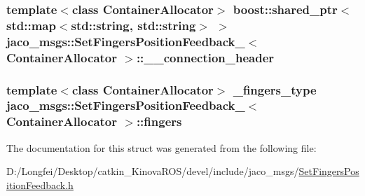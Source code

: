 \subsubsection[{\texorpdfstring{\+\_\+\+\_\+connection\+\_\+header}{__connection_header}}]{\setlength{\rightskip}{0pt plus 5cm}template$<$class Container\+Allocator$>$ boost\+::shared\+\_\+ptr$<$std\+::map$<$std\+::string, std\+::string$>$ $>$ {\bf jaco\+\_\+msgs\+::\+Set\+Fingers\+Position\+Feedback\+\_\+}$<$ Container\+Allocator $>$\+::\+\_\+\+\_\+connection\+\_\+header}\hypertarget{structjaco__msgs_1_1SetFingersPositionFeedback___ad1d89c219a6e6858c48e30c83ae4a0db}{}\label{structjaco__msgs_1_1SetFingersPositionFeedback___ad1d89c219a6e6858c48e30c83ae4a0db}
\subsubsection[{\texorpdfstring{fingers}{fingers}}]{\setlength{\rightskip}{0pt plus 5cm}template$<$class Container\+Allocator$>$ {\bf \+\_\+fingers\+\_\+type} {\bf jaco\+\_\+msgs\+::\+Set\+Fingers\+Position\+Feedback\+\_\+}$<$ Container\+Allocator $>$\+::fingers}\hypertarget{structjaco__msgs_1_1SetFingersPositionFeedback___ae2565d164d4f0daf1be357023e5d0be2}{}\label{structjaco__msgs_1_1SetFingersPositionFeedback___ae2565d164d4f0daf1be357023e5d0be2}


The documentation for this struct was generated from the following file\+:\begin{DoxyCompactItemize}
\item 
D\+:/\+Longfei/\+Desktop/catkin\+\_\+\+Kinova\+R\+O\+S/devel/include/jaco\+\_\+msgs/\hyperlink{SetFingersPositionFeedback_8h}{Set\+Fingers\+Position\+Feedback.\+h}\end{DoxyCompactItemize}
